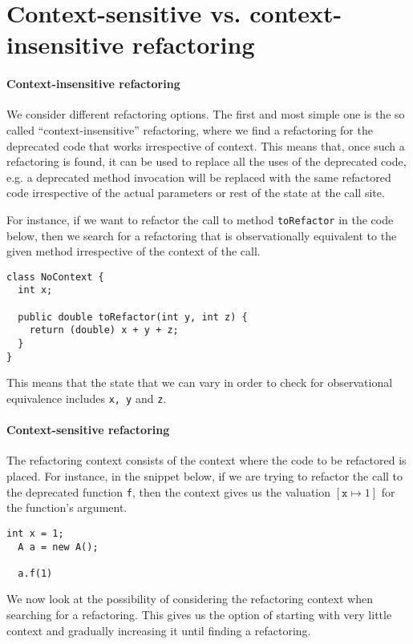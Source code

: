 \documentclass[runningheads,a4paper]{llncs}
\begin{document}
\section{Context-sensitive vs. context-insensitive refactoring}

\paragraph{Context-insensitive refactoring}
We consider different refactoring options. The first and most simple
one is the so called ``context-insensitive'' refactoring, where we
find a refactoring for the deprecated code that works irrespective of
context. This means that, once such a refactoring is found, it can be
used to replace all the uses of the deprecated code, e.g. a deprecated
method invocation will be replaced with the same refactored code
irrespective of the actual parameters or rest of the state at the call
site.

For instance, if we want to refactor the call to method
\texttt{toRefactor} in the code below, then we search for a refactoring that is
observationally equivalent to the given method irrespective of the
context of the call.

\begin{lstlisting}[mathescape=true]
class NoContext {
  int x;

  public double toRefactor(int y, int z) {
    return (double) x + y + z;
  }
}
\end{lstlisting}
 
This means that the state that we can vary in order to check for
observational equivalence includes \texttt{x, y} and \texttt{z}.

\paragraph{Context-sensitive refactoring}
The refactoring context consists of the context where the code to be refactored
is placed. For instance, in the snippet below, if we are trying to refactor the call to the deprecated
function \texttt{f}, then the context gives us the valuation $[\texttt{x}\mapsto 1]$ for the function's argument. 

\begin{lstlisting}[mathescape=true]
  int x = 1;
  A a = new A();
  
  a.f(1)
\end{lstlisting}
    
We now look at the possibility of considering the refactoring context
when searching for a refactoring. This gives us the option of starting
with very little context and gradually increasing it until finding a
refactoring. 
\end{document}
